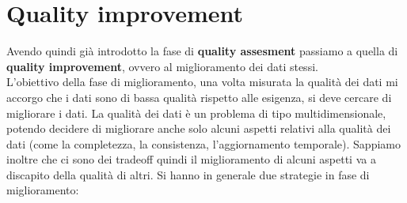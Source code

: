 \section{Quality improvement}
Avendo quindi già introdotto la fase di \textbf{quality assesment} passiamo a quella di \textbf{quality improvement}, ovvero al miglioramento dei dati stessi.\\ L'obiettivo della fase di miglioramento, una volta misurata la qualità dei dati mi accorgo che i dati sono di bassa qualità rispetto alle esigenza, si deve cercare  di migliorare i dati. La qualità dei dati è un problema di tipo multidimensionale, potendo decidere di migliorare anche solo alcuni aspetti relativi alla qualità dei dati (come la completezza, la consistenza, l'aggiornamento temporale). Sappiamo inoltre che ci sono dei tradeoff quindi il miglioramento di alcuni aspetti va a discapito della qualità di altri. Si hanno in generale due strategie in fase di miglioramento:
